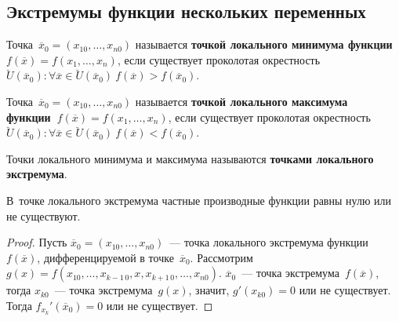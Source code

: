 \subsection{Экстремумы функции нескольких переменных}
 Точка~$\overline x_0 = (x_{10}, \ldots, x_{n0})$ называется \textbf{точкой локального минимума функции~$f(\overline x) = f(x_1, \ldots, x_n)$}, если существует проколотая окрестность
$\breve U(\overline x_0) \colon \forall \overline x \in \breve U(\overline x_0) \
f(\overline x) > f(\overline x_0)$.
	
 Точка~$\overline x_0 = (x_{10}, \ldots, x_{n0})$ называется \textbf{точкой локального максимума функции~$f(\overline x) = f(x_1, \ldots, x_n)$}, если существует проколотая окрестность
$\breve U(\overline x_0) \colon \forall \overline x \in \breve U(\overline x_0) \
f(\overline x) < f(\overline x_0)$.

 Точки локального минимума и максимума называются \textbf{точками локального экстремума}.
	
\begin{theorem}
В~точке локального экстремума частные производные функции равны нулю или не существуют.
\end{theorem}
\begin{proof}
Пусть $\overline x_0 = (x_{10}, \ldots, x_{n0})$~--- точка локального экстремума функции~$f(\overline x)$, дифференцируемой в точке~$\overline x_0$.
Рассмотрим $g(x) = f(x_{10}, \ldots, x_{k-1\,0}, x, x_{k+1\,0}, \ldots, x_{n0})$.
$\overline x_0$~--- точка экстремума~$f(\overline x)$, тогда $x_{k0}$~--- точка экстремума~$g(x)$, значит, $g'(x_{k0}) = 0$ или не существует.
Тогда $f_{x_k}'(\overline x_0) = 0$ или не существует.
\end{proof}

